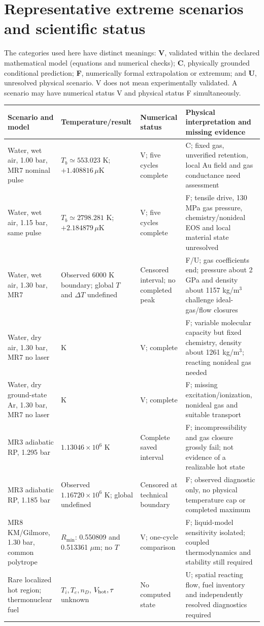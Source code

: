 \documentclass[11pt,a4paper]{article}
\begin{document}
\section{Representative extreme scenarios and scientific status}
The categories used here have distinct meanings: \textbf{V}, validated within the declared mathematical model (equations and numerical checks); \textbf{C}, physically grounded conditional prediction; \textbf{F}, numerically formal extrapolation or extremum; and \textbf{U}, unresolved physical scenario. V does not mean experimentally validated. A scenario may have numerical status V and physical status F simultaneously.
\begin{center}\small
\begin{tabular}{>{\raggedright\arraybackslash}p{3.4cm}>{\raggedright\arraybackslash}p{3.3cm}>{\raggedright\arraybackslash}p{2.6cm}>{\raggedright\arraybackslash}p{5.0cm}}\toprule
Scenario and model&Temperature/result&Numerical status&Physical interpretation and missing evidence\\\midrule
Water, wet air, 1.00 bar, MR7 nominal pulse&$T_b\simeq553.023$ K; $+1.408816\,\mu$K&V; five cycles complete&C; fixed gas, unverified retention, local Au field and gas conductance need assessment\\[4pt]
Water, wet air, 1.15 bar, same pulse&$T_b\simeq2798.281$ K; $+2.184879\,\mu$K&V; five cycles complete&F; tensile drive, 130 MPa gas pressure, chemistry/nonideal EOS and local material state unresolved\\[4pt]
Water, wet air, 1.30 bar, MR7&Observed 6000 K boundary; global $T$ and $\Delta T$ undefined&Censored interval; no completed peak&F/U; gas coefficients end; pressure about 2 GPa and density about 1157 kg/m$^3$ challenge ideal-gas/flow closures\\[4pt]
Water, dry air, 1.30 bar, MR7 no laser&6263.58 K&V; complete&F; variable molecular capacity but fixed chemistry, density about 1261 kg/m$^3$; reacting nonideal gas needed\\[4pt]
Water, dry ground-state Ar, 1.30 bar, MR7 no laser&22808.7 K&V; complete&F; missing excitation/ionization, nonideal gas and suitable transport\\[4pt]
MR3 adiabatic RP, 1.295 bar&$1.13046\times10^6$ K&Complete saved interval&F; incompressibility and gas closure grossly fail; not evidence of a realizable hot state\\[4pt]
MR3 adiabatic RP, 1.185 bar&Observed $1.16720\times10^6$ K; global undefined&Censored at technical boundary&F; observed diagnostic only, no physical temperature cap or completed maximum\\[4pt]
MR8 KM/Gilmore, 1.30 bar, common polytrope&$R_{\min}$: 0.550809 and 0.513361 $\mu$m; no $T$&V; one-cycle comparison&F; liquid-model sensitivity isolated; coupled thermodynamics and stability still required\\[4pt]
Rare localized hot region; thermonuclear fuel&$T_i,T_e,n_D$, $V_{\rm hot},\tau$ unknown&No computed state&U; spatial reacting flow, fuel inventory and independently resolved diagnostics required\\\bottomrule
\end{tabular}
\end{center}
\end{document}

